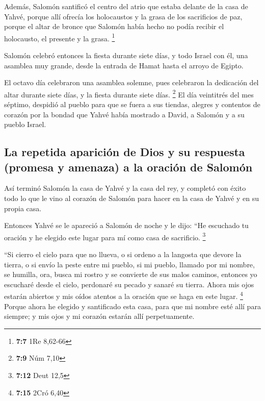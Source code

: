  Además, Salomón santificó el centro del atrio que estaba
delante de la casa de Yahvé, porque allí ofrecía los holocaustos y la
grasa de los sacrificios de paz, porque el altar de bronce que Salomón
había hecho no podía recibir el holocausto, el presente y la grasa.
\footnote{\textbf{7:7} 1Re 8,62-66}

 Salomón celebró entonces la fiesta durante siete días, y
todo Israel con él, una asamblea muy grande, desde la entrada de Hamat
hasta el arroyo de Egipto.

 El octavo día celebraron una asamblea solemne, pues
celebraron la dedicación del altar durante siete días, y la fiesta
durante siete días. \footnote{\textbf{7:9} Núm 7,10}  El
día veintitrés del mes séptimo, despidió al pueblo para que se fuera a
sus tiendas, alegres y contentos de corazón por la bondad que Yahvé
había mostrado a David, a Salomón y a su pueblo Israel.

\hypertarget{la-repetida-apariciuxf3n-de-dios-y-su-respuesta-promesa-y-amenaza-a-la-oraciuxf3n-de-salomuxf3n}{%
\subsection{La repetida aparición de Dios y su respuesta (promesa y
amenaza) a la oración de
Salomón}\label{la-repetida-apariciuxf3n-de-dios-y-su-respuesta-promesa-y-amenaza-a-la-oraciuxf3n-de-salomuxf3n}}

 Así terminó Salomón la casa de Yahvé y la casa del rey,
y completó con éxito todo lo que le vino al corazón de Salomón para
hacer en la casa de Yahvé y en su propia casa.

 Entonces Yahvé se le apareció a Salomón de noche y le
dijo: ``He escuchado tu oración y he elegido este lugar para mí como
casa de sacrificio. \footnote{\textbf{7:12} Deut 12,5}

 ``Si cierro el cielo para que no llueva, o si ordeno a
la langosta que devore la tierra, o si envío la peste entre mi pueblo,
 si mi pueblo, llamado por mi nombre, se humilla, ora,
busca mi rostro y se convierte de sus malos caminos, entonces yo
escucharé desde el cielo, perdonaré su pecado y sanaré su tierra.
 Ahora mis ojos estarán abiertos y mis oídos atentos a la
oración que se haga en este lugar. \footnote{\textbf{7:15} 2Cró 6,40}
 Porque ahora he elegido y santificado esta casa, para
que mi nombre esté allí para siempre; y mis ojos y mi corazón estarán
allí perpetuamente.

